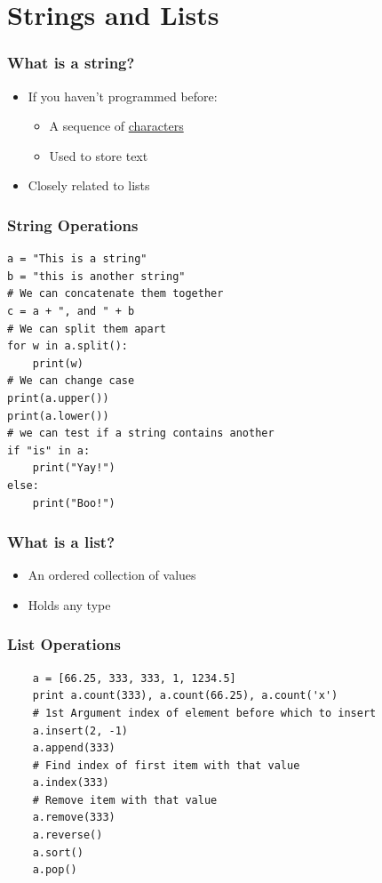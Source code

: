 \documentclass[aspectratio=169]{beamer}
\begin{document}
\section{Strings and Lists}
\begin{frame}
  \frametitle{What is a string?}
  \begin{itemize}
    \item If you haven't programmed before:
      \begin{itemize}
        \item A sequence of \underline{characters}
        \item Used to store text
      \end{itemize}
    \pause
    \item Closely related to lists
  \end{itemize}
\end{frame}
\begin{frame}[fragile]
  \frametitle{String Operations}
  \begin{verbatim}
a = "This is a string"
b = "this is another string"
# We can concatenate them together
c = a + ", and " + b
# We can split them apart
for w in a.split():
    print(w)
# We can change case
print(a.upper())
print(a.lower())
# we can test if a string contains another
if "is" in a:
    print("Yay!")
else:
    print("Boo!")
  \end{verbatim}
\end{frame}
\begin{frame}
  \frametitle{What is a list?}
  \begin{itemize}
    \item An ordered collection of values
    \item Holds any type
  \end{itemize}
\end{frame}
\begin{frame}[fragile]
  \frametitle{List Operations}
  \begin{verbatim}
    a = [66.25, 333, 333, 1, 1234.5]
    print a.count(333), a.count(66.25), a.count('x')
    # 1st Argument index of element before which to insert
    a.insert(2, -1)
    a.append(333)
    # Find index of first item with that value
    a.index(333)
    # Remove item with that value
    a.remove(333)
    a.reverse()
    a.sort()
    a.pop()
  \end{verbatim}
\end{frame}
\end{document}
